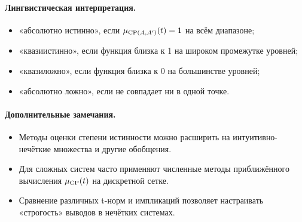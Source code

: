 \paragraph{Лингвистическая интерпретация.}  
\begin{itemize}
  \item «абсолютно истинно», если $\mu_{\operatorname{CP}(A,A')}(t)=1$ на всём диапазоне;
  \item «квазиистинно», если функция близка к 1 на широком промежутке уровней;
  \item «квазиложно», если функция близка к 0 на большинстве уровней;
  \item «абсолютно ложно», если не совпадает ни в одной точке.
\end{itemize}

\paragraph{Дополнительные замечания.}
\begin{itemize}
  \item Методы оценки степени истинности можно расширить на интуитивно-нечёткие множества и другие обобщения.
  \item Для сложных систем часто применяют численные методы приближённого вычисления $\mu_{\operatorname{CP}}(t)$ на дискретной сетке.
  \item Сравнение различных t-норм и импликаций позволяет настраивать «строгость» выводов в нечётких системах.
\end{itemize}
%
%
